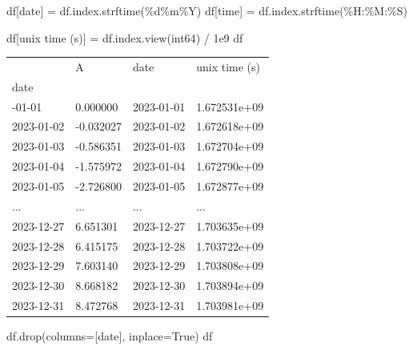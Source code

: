 \documentclass[
  letterpaper,
  DIV=11,
  numbers=noendperiod,
  oneside]{scrreprt}
\newenvironment{Shaded}{\begin{snugshade}}{\end{snugshade}}
\newcommand{\FloatTok}[1]{\textcolor[rgb]{0.68,0.00,0.00}{#1}}
\newcommand{\NormalTok}[1]{\textcolor[rgb]{0.00,0.23,0.31}{#1}}
\newcommand{\OperatorTok}[1]{\textcolor[rgb]{0.37,0.37,0.37}{#1}}
\newcommand{\SpecialCharTok}[1]{\textcolor[rgb]{0.37,0.37,0.37}{#1}}
\newcommand{\StringTok}[1]{\textcolor[rgb]{0.13,0.47,0.30}{#1}}
\newcommand{\VariableTok}[1]{\textcolor[rgb]{0.07,0.07,0.07}{#1}}
\begin{document}
\begin{Shaded}
\begin{Highlighting}[]
\NormalTok{df[}\StringTok{\textquotesingle{}date\textquotesingle{}}\NormalTok{] }\OperatorTok{=}\NormalTok{ df.index.strftime(}\StringTok{\textquotesingle{}}\SpecialCharTok{\%d}\StringTok{\%m\%Y\textquotesingle{}}\NormalTok{)}
\NormalTok{df[}\StringTok{\textquotesingle{}time\textquotesingle{}}\NormalTok{] }\OperatorTok{=}\NormalTok{ df.index.strftime(}\StringTok{\textquotesingle{}\%H:\%M:\%S\textquotesingle{}}\NormalTok{)}
\end{Highlighting}
\end{Shaded}

\begin{Shaded}
\begin{Highlighting}[]
\NormalTok{df[}\StringTok{\textquotesingle{}unix time (s)\textquotesingle{}}\NormalTok{] }\OperatorTok{=}\NormalTok{ df.index.view(}\StringTok{\textquotesingle{}int64\textquotesingle{}}\NormalTok{) }\OperatorTok{/} \FloatTok{1e9}
\NormalTok{df}
\end{Highlighting}
\end{Shaded}

\begin{longtable}[]{@{}llll@{}}
\toprule\noalign{}
& A & date & unix time (s) \\
date & & & \\
\midrule\noalign{}
\endhead
\bottomrule\noalign{}
\endlastfoot
2023-01-01 & 0.000000 & 2023-01-01 & 1.672531e+09 \\
2023-01-02 & -0.032027 & 2023-01-02 & 1.672618e+09 \\
2023-01-03 & -0.586351 & 2023-01-03 & 1.672704e+09 \\
2023-01-04 & -1.575972 & 2023-01-04 & 1.672790e+09 \\
2023-01-05 & -2.726800 & 2023-01-05 & 1.672877e+09 \\
... & ... & ... & ... \\
2023-12-27 & 6.651301 & 2023-12-27 & 1.703635e+09 \\
2023-12-28 & 6.415175 & 2023-12-28 & 1.703722e+09 \\
2023-12-29 & 7.603140 & 2023-12-29 & 1.703808e+09 \\
2023-12-30 & 8.668182 & 2023-12-30 & 1.703894e+09 \\
2023-12-31 & 8.472768 & 2023-12-31 & 1.703981e+09 \\
\end{longtable}

\begin{Shaded}
\begin{Highlighting}[]
\NormalTok{df.drop(columns}\OperatorTok{=}\NormalTok{[}\StringTok{\textquotesingle{}date\textquotesingle{}}\NormalTok{], inplace}\OperatorTok{=}\VariableTok{True}\NormalTok{)}
\NormalTok{df}
\end{Highlighting}
\end{Shaded}
\end{document}
